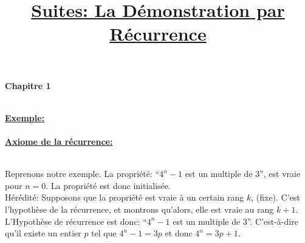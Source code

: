\documentclass[12pt, a4paper]{book}
\makeatletter
\renewcommand\maketitle{
{\raggedright
{\large \bfseries Chapitre 1}\\[4ex]
{\Large \bfseries \@title}\\[4ex]}}
\makeatother
\begin{document}
    \title{\underline{Suites: La Démonstration par Récurrence}}
    \maketitle

    \textbf{\underline{Exemple:}}\\[2ex]
     \\[2ex]
    \indent \textbf{\underline{Axiome de la récurrence:}}\\[2ex]
    \\[4ex]
    {\indent\parbox[t]{\dimexpr\linewidth-\parindent}{
        Reprenons notre exemple. La propriété: ``$4^n-1$ est un multiple de 3'', est vraie pour $n=0$. La propriété est donc initialisée.\\[2ex]
        Hérédité: Supposons que la propriété est vraie à un certain rang $k$, (fixe). C'est l'hypothèse de la récurrence, et montrons qu'alors, elle est vraie au rang $k+1$.\\[2ex]
        L'Hypothèse de récurrence est donc: ``$4^n-1$ est un multiple de 3''. C'est-à-dire qu'il existe un entier $p$ tel que $4^n-1=3p$ et donc $4^n=3p+1$. \pagebreak
    }}
\end{document}
